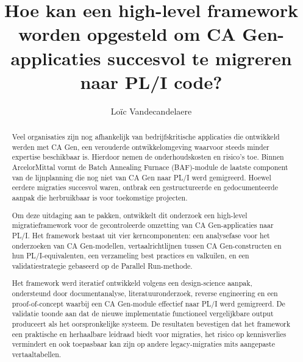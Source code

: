 \documentclass[a0,portrait]{hogent-poster}
\title{Hoe kan een high-level framework worden opgesteld om CA Gen-applicaties succesvol te migreren naar PL/I code?}
\author{Loïc Vandecandelaere}
\begin{document}
\maketitle

\begin{abstract}
Veel organisaties zijn nog afhankelijk van bedrijfskritische applicaties die ontwikkeld werden met CA Gen, een verouderde ontwikkelomgeving waarvoor steeds minder expertise beschikbaar is. Hierdoor nemen de onderhoudskosten en risico’s toe. Binnen ArcelorMittal vormt de Batch Annealing Furnace (BAF)-module de laatste component van de lijnplanning die nog niet van CA Gen naar PL/I werd gemigreerd. Hoewel eerdere migraties succesvol waren, ontbrak een gestructureerde en gedocumenteerde aanpak die herbruikbaar is voor toekomstige projecten.

Om deze uitdaging aan te pakken, ontwikkelt dit onderzoek een high-level migratieframework voor de gecontroleerde omzetting van CA Gen-applicaties naar PL/I. Het framework bestaat uit vier kerncomponenten: een analysefase voor het onderzoeken van CA Gen-modellen, vertaalrichtlijnen tussen CA Gen-constructen en hun PL/I-equivalenten, een verzameling best practices en valkuilen, en een validatiestrategie gebaseerd op de Parallel Run-methode.

Het framework werd iteratief ontwikkeld volgens een design-science aanpak, ondersteund door documentanalyse, literatuuronderzoek, reverse engineering en een proof-of-concept waarbij een CA Gen-module effectief naar PL/I werd gemigreerd. De validatie toonde aan dat de nieuwe implementatie functioneel vergelijkbare output produceert als het oorspronkelijke systeem. De resultaten bevestigen dat het framework een praktische en herhaalbare leidraad biedt voor migraties, het risico op kennisverlies vermindert en ook toepasbaar kan zijn op andere legacy-migraties mits aangepaste vertaaltabellen.
\end{abstract}
\end{document}
